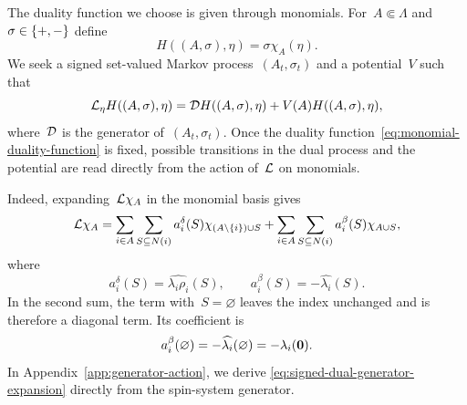 \documentclass[EJP,preprint,NODS,nobera]{ejpecp}
\begin{document}
The duality function we choose is given through monomials. For~$A\Subset\Lambda$ and~$\sigma\in\left\{+,-\right\}$  define
\begin{equation}
\label{eq:monomial-duality-function}
H((A,\sigma),\eta)
=
\sigma\chi_A(\eta).
\end{equation}
We seek a signed set-valued Markov process~$(A_t,\sigma_t)$ and a potential~$V$
such that
\begin{equation}
\label{eq:monomial-generator-duality}
\mathcal{L}_\eta H((A,\sigma),\eta)
=
\mathcal{D} H((A,\sigma),\eta)
+
V(A)H((A,\sigma),\eta),
\end{equation}
where~$\mathcal{D}$ is the generator of~$(A_t,\sigma_t)$. Once the duality
function~\eqref{eq:monomial-duality-function} is fixed, possible transitions in the dual process and the potential are read directly from the action of~$\mathcal{L}$
on monomials.

Indeed, expanding~$\mathcal{L}\chi_A$ in the monomial basis gives
\begin{equation}
\label{eq:signed-dual-generator-expansion}
\mathcal{L}\chi_A
=
\sum_{i\in A}\sum_{S\subseteq N(i)}
a_i^\delta(S)\chi_{\left(A\setminus\left\{i\right\}\right)\cup S}
+
\sum_{i\in A}\sum_{S\subseteq N(i)}
a_i^\beta(S)\chi_{A\cup S},
\end{equation}
where
\begin{equation}
\label{eq:signed-dual-coefficients}
a_i^\delta(S)
=
\widehat{\lambda_i\rho_i}(S),
\qquad
a_i^\beta(S)
=
-\widehat{\lambda_i}(S).
\end{equation}
In the second sum, the term with~$S=\varnothing$ leaves the index unchanged
and is therefore a diagonal term. Its coefficient is
\begin{equation*}
a_i^\beta(\varnothing)
=
-\widehat{\lambda_i}(\varnothing)
=
-\lambda_i(\mathbf{0}).
\end{equation*}
In Appendix~\ref{app:generator-action}, we derive
\eqref{eq:signed-dual-generator-expansion} directly from the spin-system
generator.
\end{document}
